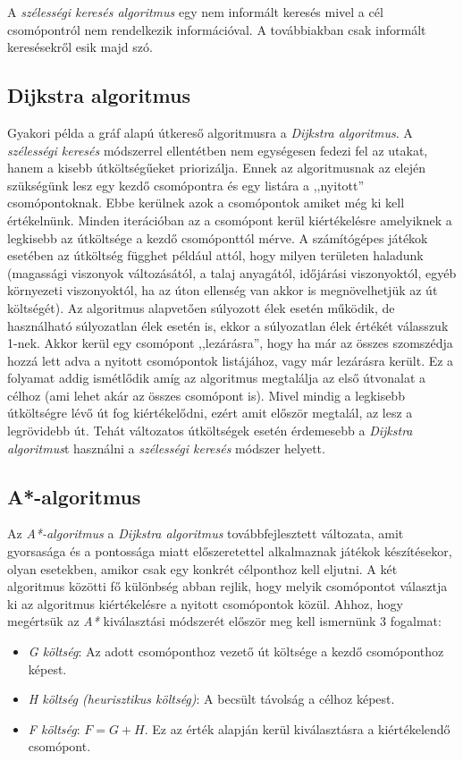 A \textit{szélességi keresés algoritmus} egy nem informált keresés mivel a cél csomópontról nem rendelkezik információval. A továbbiakban csak informált keresésekről esik majd szó.

\subsection{Dijkstra algoritmus}
\cite{algoritmusok}
\cite{Dijkstra}
\cite{Pathfinding}

Gyakori példa a gráf alapú útkereső algoritmusra a \textit{Dijkstra algoritmus}. A \textit{szélességi keresés} módszerrel ellentétben nem egységesen fedezi fel az utakat, hanem a kisebb útköltségűeket priorizálja. Ennek az algoritmusnak az elején szükségünk lesz egy kezdő csomópontra és egy listára a ,,nyitott'' csomópontoknak. Ebbe kerülnek azok a csomópontok amiket még ki kell értékelnünk. Minden iterációban az a csomópont kerül kiértékelésre amelyiknek a legkisebb az útköltsége a kezdő csomóponttól mérve. A számítógépes játékok esetében az útköltség függhet például attól, hogy milyen területen haladunk (magassági viszonyok változásától, a talaj anyagától, időjárási viszonyoktól, egyéb környezeti viszonyoktól, ha az úton ellenség van akkor is megnövelhetjük az út költségét). Az algoritmus alapvetően súlyozott élek esetén működik, de használható súlyozatlan élek esetén is, ekkor a súlyozatlan élek értékét válasszuk 1-nek. Akkor kerül egy csomópont ,,lezárásra'', hogy ha már az összes szomszédja hozzá lett adva a nyitott csomópontok listájához, vagy már lezárásra került. Ez a folyamat addig ismétlődik amíg az algoritmus megtalálja az első útvonalat a célhoz (ami lehet akár az összes csomópont is). Mivel mindig a legkisebb útköltségre lévő út fog kiértékelődni, ezért amit először megtalál, az lesz a legrövidebb út. Tehát változatos útköltségek esetén érdemesebb a \textit{Dijkstra algoritmus}t használni a \textit{szélességi keresés} módszer helyett.

\newpage
\subsection{A*-algoritmus}
\cite{algoritmusok}
\cite{redblobA*}
\cite{Pathfinding}
\cite{A*}

Az \textit{A*-algoritmus} a \textit{Dijkstra algoritmus} továbbfejlesztett változata, amit gyorsasága és a pontossága miatt előszeretettel alkalmaznak játékok készítésekor, olyan esetekben, amikor csak egy konkrét célponthoz kell eljutni. A két algoritmus közötti fő különbség abban rejlik, hogy melyik csomópontot választja ki az algoritmus kiértékelésre a nyitott csomópontok közül. Ahhoz, hogy megértsük az \textit{A*} kiválasztási módszerét először meg kell ismernünk 3 fogalmat:
\begin{itemize}
\item \textit{G költség}: Az adott csomóponthoz vezető út költsége a kezdő csomóponthoz képest.
\item \textit{H költség (heurisztikus költség)}: A becsült távolság a célhoz képest.
\item \textit{F költség}: $F = G + H$. Ez az érték alapján kerül kiválasztásra a kiértékelendő csomópont.
\end{itemize}

